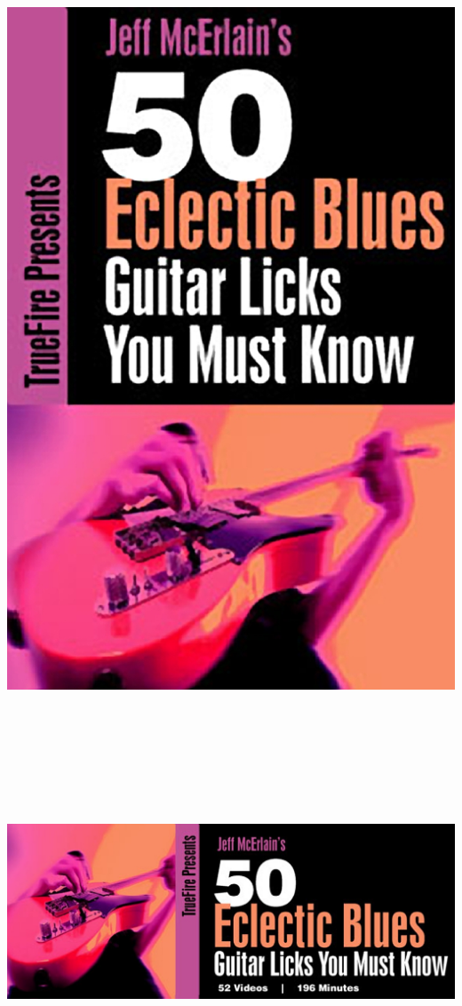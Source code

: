\documentclass[a4paper]{book}
\begin{document}
\begin{center}
\includegraphics[width=17cm,height=25.904cm]{lebluessupportsmethodes-img86.jpg}
\end{center}


\begin{center}
\includegraphics[width=17cm,height=6.639cm]{lebluessupportsmethodes-img87.jpg}
\end{center}
\end{document}

